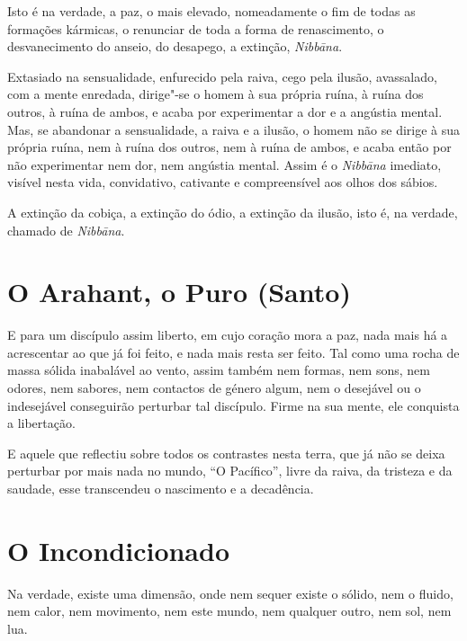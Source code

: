 Isto é na verdade, a paz, o mais elevado, nomeadamente o fim de todas as
formações kármicas, o renunciar de toda a forma de renascimento, o
desvanecimento do anseio, do desapego, a extinção, \emph{Nibbāna}.


Extasiado na sensualidade, enfurecido pela raiva, cego pela ilusão, avassalado,
com a mente enredada, dirige"-se o homem à sua própria ruína, à ruína dos outros,
à ruína de ambos, e acaba por experimentar a dor e a angústia mental. Mas, se
abandonar a sensualidade, a raiva e a ilusão, o homem não se dirige à sua
própria ruína, nem à ruína dos outros, nem à ruína de ambos, e acaba então por
não experimentar nem dor, nem angústia mental. Assim é o \emph{Nibbāna}
imediato, visível nesta vida, convidativo, cativante e compreensível aos olhos
dos sábios.


A extinção da cobiça, a extinção do ódio, a extinção da ilusão, isto é, na
verdade, chamado de \emph{Nibbāna}.


\clearpage

\section{O Arahant, o Puro (Santo)}

E para um discípulo assim liberto, em cujo coração mora a paz, nada mais há a
acrescentar ao que já foi feito, e nada mais resta ser feito. Tal como uma rocha
de massa sólida inabalável ao vento, assim também nem formas, nem sons, nem
odores, nem sabores, nem contactos de género algum, nem o desejável ou o
indesejável conseguirão perturbar tal discípulo. Firme na sua mente, ele
conquista a libertação.


E aquele que reflectiu sobre todos os contrastes nesta terra, que já não se
deixa perturbar por mais nada no mundo, ``O Pacífico'', livre da raiva, da
tristeza e da saudade, esse transcendeu o nascimento e a decadência.


\section{O Incondicionado}

Na verdade, existe uma dimensão, onde nem sequer existe o sólido, nem o fluido,
nem calor, nem movimento, nem este mundo, nem qualquer outro, nem sol, nem lua.

